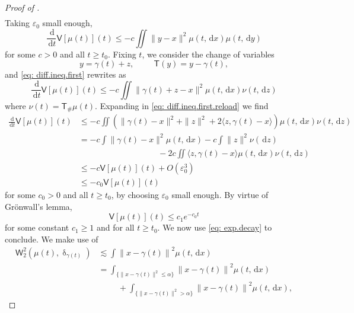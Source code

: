 \documentclass[a4paper,11pt]{article}
\theoremstyle{plain}
\newcommand{\diff}{\, \mathrm{d}}
\renewcommand{\leq}{\leqslant}
\renewcommand{\geq}{\geqslant}
\numberwithin{equation}{section}
\begin{document}
\begin{proof}[Proof of ]
\begin{align*}
\end{align*}
Taking $\varepsilon_0$ small enough, 
\begin{equation} \label{eq: diff.ineq.first}
    \frac{\diff}{\diff t} \mathsf{V}[\mu(t)](t)\leq - c\iint \|y-x\|^2\mu(t,\diff x)\mu(t,\diff y)
\end{equation}
for some $c>0$ and all $t\geq t_0$. Fixing $t$, we consider the change of variables
\begin{equation*}
    y=\gamma(t)+z,\hspace{1cm}\mathsf{T}(y)=y-\gamma(t),
\end{equation*}
and \eqref{eq: diff.ineq.first} rewrites as
\begin{equation}\label{eq: diff.ineq.first.reload}
    \frac{\diff}{\diff t} \mathsf{V}[\mu(t)](t)\leq - c\iint \|\gamma(t)+z-x\|^2\mu(t,\diff x)\nu(t,\diff z)
\end{equation}
where $\nu(t)=\mathsf{T}_\#\mu(t).$
Expanding in \eqref{eq: diff.ineq.first.reload} we find
\begin{align} \label{eq: diff.ineq.second}
    \frac{\diff}{\diff t} \mathsf{V}[\mu(t)](t)&\leq - c\iint \left(\|\gamma(t)-x\|^2+\|z\|^2+2\langle z,\gamma(t)-x\rangle\right)\mu(t,\diff x)\nu(t,\diff z)\nonumber\\
    &=- c\int\|\gamma(t)-x\|^2\mu(t,\diff x)-c\int \|z\|^2\nu(\diff z)\nonumber\\
    &\hspace{4cm}-2c\iint \langle z,\gamma(t)-x\rangle\mu(t,\diff x)\nu(t,\diff z)\nonumber\\
    &\leq -c\mathsf{V}[\mu(t)](t)+O\left(\varepsilon_0^3\right)\nonumber\\
    &\leq -c_0\mathsf{V}[\mu(t)](t)
\end{align}
for some $c_0>0$ and all $t\geq t_0$, by choosing $\varepsilon_0$ small enough. By virtue of Gr\"onwall's lemma,
\begin{equation}\label{eq: exp.decay}
    \mathsf{V}[\mu(t)](t)\leq c_1e^{-c_0t}
\end{equation}
for some constant $c_1\geq 1$ and for all $t\geq t_0$. We now use \eqref{eq: exp.decay} to conclude. We make use of  
\begin{align} \mathsf{W}_2^2\left(\mu(t),\updelta_{\gamma(t)}\right)&\lesssim\int \left\|x-\gamma(t)\right\|^2\mu(t,\diff x)\label{eq: W2.transport}\\
&=\int_{\{\|x-\gamma(t)\|^2\leq\alpha\}} \left\|x-\gamma(t)\right\|^2\mu(t,\diff x)\nonumber\\
&\hspace{1cm}+\int_{\{\|x-\gamma(t)\|^2>\alpha\}} \left\|x-\gamma(t)\right\|^2\mu(t,\diff x) \nonumber,

\end{align}
\end{proof}
\end{document}
